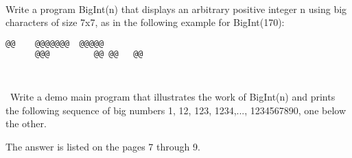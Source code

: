 \documentclass{article}
\begin{document}
	\rmfamily\
	
		Write a program BigInt(n) that displays an arbitrary positive integer n using big characters of size 7x7, as in the following example for BigInt(170):
				
	\ttfamily
	\begin{lstlisting}[language=bash]		
	   @@ 	 @@@@@@@  @@@@@  
	  @@@  	      @@ @@   @@ 

		 
	\end{lstlisting}
	
	\rmfamily\
	Write a demo main program that illustrates the work of BigInt(n) and prints the following sequence of big numbers 1, 12, 123, 1234,..., 1234567890, one below the other.
	\newline
	
	The answer is listed on the pages 7 through 9.
	
	
\paragraph{}\
\paragraph{}\
\paragraph{}\
\paragraph{}\
\paragraph{}\
\paragraph{}\
\paragraph{}\
\paragraph{}\
\paragraph{}\
\paragraph{}\
\end{document}
